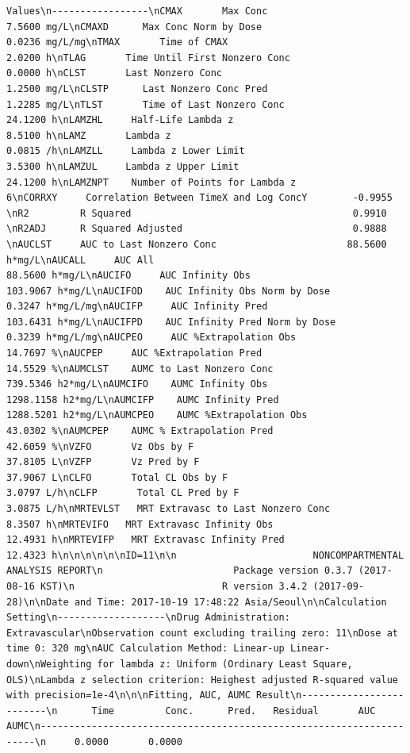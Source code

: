 \documentclass[]{krantz}
\theoremstyle{definition}
\theoremstyle{definition}
\theoremstyle{definition}
\theoremstyle{remark}
\begin{document}
\begin{verbatim}
Values\n-----------------\nCMAX       Max Conc                                        7.5600 mg/L\nCMAXD      Max Conc Norm by Dose                           0.0236 mg/L/mg\nTMAX       Time of CMAX                                    2.0200 h\nTLAG       Time Until First Nonzero Conc                   0.0000 h\nCLST       Last Nonzero Conc                               1.2500 mg/L\nCLSTP      Last Nonzero Conc Pred                          1.2285 mg/L\nTLST       Time of Last Nonzero Conc                      24.1200 h\nLAMZHL     Half-Life Lambda z                              8.5100 h\nLAMZ       Lambda z                                        0.0815 /h\nLAMZLL     Lambda z Lower Limit                            3.5300 h\nLAMZUL     Lambda z Upper Limit                           24.1200 h\nLAMZNPT    Number of Points for Lambda z                   6\nCORRXY     Correlation Between TimeX and Log ConcY        -0.9955 \nR2         R Squared                                       0.9910 \nR2ADJ      R Squared Adjusted                              0.9888 \nAUCLST     AUC to Last Nonzero Conc                       88.5600 h*mg/L\nAUCALL     AUC All                                        88.5600 h*mg/L\nAUCIFO     AUC Infinity Obs                              103.9067 h*mg/L\nAUCIFOD    AUC Infinity Obs Norm by Dose                   0.3247 h*mg/L/mg\nAUCIFP     AUC Infinity Pred                             103.6431 h*mg/L\nAUCIFPD    AUC Infinity Pred Norm by Dose                  0.3239 h*mg/L/mg\nAUCPEO     AUC %Extrapolation Obs                         14.7697 %\nAUCPEP     AUC %Extrapolation Pred                        14.5529 %\nAUMCLST    AUMC to Last Nonzero Conc                     739.5346 h2*mg/L\nAUMCIFO    AUMC Infinity Obs                            1298.1158 h2*mg/L\nAUMCIFP    AUMC Infinity Pred                           1288.5201 h2*mg/L\nAUMCPEO    AUMC %Extrapolation Obs                        43.0302 %\nAUMCPEP    AUMC % Extrapolation Pred                      42.6059 %\nVZFO       Vz Obs by F                                    37.8105 L\nVZFP       Vz Pred by F                                   37.9067 L\nCLFO       Total CL Obs by F                               3.0797 L/h\nCLFP       Total CL Pred by F                              3.0875 L/h\nMRTEVLST   MRT Extravasc to Last Nonzero Conc              8.3507 h\nMRTEVIFO   MRT Extravasc Infinity Obs                     12.4931 h\nMRTEVIFP   MRT Extravasc Infinity Pred                    12.4323 h\n\n\n\n\n\nID=11\n\n                        NONCOMPARTMENTAL ANALYSIS REPORT\n                       Package version 0.3.7 (2017-08-16 KST)\n                          R version 3.4.2 (2017-09-28)\n\nDate and Time: 2017-10-19 17:48:22 Asia/Seoul\n\nCalculation Setting\n-------------------\nDrug Administration: Extravascular\nObservation count excluding trailing zero: 11\nDose at time 0: 320 mg\nAUC Calculation Method: Linear-up Linear-down\nWeighting for lambda z: Uniform (Ordinary Least Square, OLS)\nLambda z selection criterion: Heighest adjusted R-squared value with precision=1e-4\n\n\nFitting, AUC, AUMC Result\n-------------------------\n      Time         Conc.      Pred.   Residual       AUC       AUMC\n---------------------------------------------------------------------\n     0.0000       0.0000 
\end{verbatim}
\end{document}
